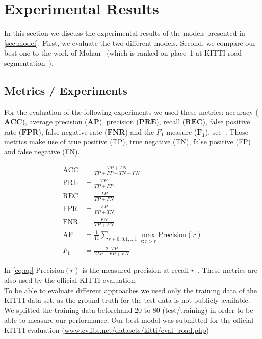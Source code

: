 
\section{Experimental Results}\label{sec:evaluation}

In this section we discuss the experimental results of the models
presented in \cref{sec:model}. First, we evaluate the two different
models. Second, we compare our best one to the work of
Mohan~\cite{Tarel2009} (which is ranked on place~1 at KITTI road
segmentation~\cite{Tarel2009}).


\subsection{Metrics / Experiments}
For the evaluation of the following experiments we used these metrics: accuracy
($\mathbf{ACC}$), average precision ($\mathbf{AP}$), precision
($\mathbf{PRE}$),  recall ($\mathbf{REC}$), false positive rate
($\mathbf{FPR}$),  false negative rate ($\mathbf{FNR}$) and the $F_1$-measure
($\mathbf{F_1}$), see~. Those metrics make
use of true positive (TP), true negative (TN), false positive (FP) and false
negative (FN).

\begin{align}\label{eq:accuracy}
\text{ACC} &= \frac{TP + TN}{TP + FP + TN + FN}\\
\text{PRE} &= \frac{TP}{TP + FP}\label{eq:precision}\\
\text{REC} &= \frac{TP}{TP + FN}\label{eq:recall}\\
\text{FPR} &= \frac{FP}{FP + TN}\label{eq:fpr}\\
\text{FNR} &= \frac{FN}{TP+ FN}\label{eq:fnr}\\
\text{AP} &= \frac{1}{11} \displaystyle\sum_{r \in 0,0.1,\dots 1} \max_{\tilde{r}: \tilde{r} > r} \text{Precision}(\tilde{r})\label{eq:ap}\\
F_1 &= \frac{2 \cdot TP}{2TP +FP +FN}\label{eq:fMeasure}
\end{align}

In \cref{eq:ap}  $\text{Precision}(\tilde{r})$ is the measured precision at
recall $\tilde{r}$~\cite{everingham2010pascal}. These metrics are also used by
the official KITTI evaluation. \\ To be able to evaluate different approaches
we used only the training data of the KITTI data set, as the ground truth for
the test data is not publicly available. We splitted the training data
beforehand 20 to 80 (test/training) in order to be able to measure our
performance. Our best model was submitted for the official KITTI evaluation
(\href{http://www.cvlibs.net/datasets/kitti/eval_road.php}{www.cvlibs.net/datasets/kitti/eval\_road.php})\\

